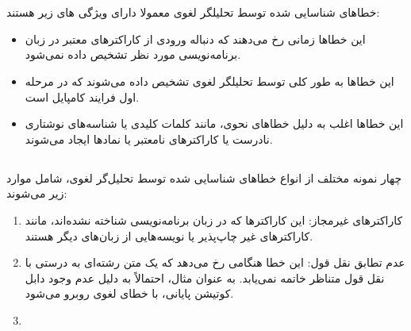 \documentclass{article}
\begin{document}


\section{}
\subsection{}
خطاهای شناسایی شده توسط تحلیلگر لغوی معمولا دارای ویژگی های زیر هستند:
\begin{itemize}
\item این خطاها زمانی رخ می‌دهند که دنباله ورودی از کاراکترهای معتبر در زبان برنامه‌نویسی مورد نظر تشخیص داده نمی‌شود.
\item این خطاها به طور کلی توسط تحلیلگر لغوی تشخیص داده می‌شوند که در مرحله اول فرایند کامپایل است.
\item این خطاها اغلب به دلیل خطاهای نحوی، مانند کلمات کلیدی یا شناسه‌های نوشتاری نادرست یا کاراکترهای نامعتبر یا نمادها ایجاد می‌شوند.
\end{itemize}

\subsection{}
چهار نمونه مختلف از انواع خطاهای شناسایی شده توسط تحلیل‌گر لغوی، شامل موارد زیر می‌شوند:

\begin{enumerate}
\item کاراکترهای غیرمجاز: این کاراکترها که در زبان برنامه‌نویسی شناخته نشده‌اند، مانند کاراکترهای غیر چاپ‌پذیر یا نویسه‌هایی از زبان‌های دیگر هستند.
\item عدم تطابق نقل قول: این خطا هنگامی رخ می‌دهد که یک متن رشته‌ای به درستی با نقل قول متناظر خاتمه نمی‌یابد. به عنوان مثال،  احتمالاً به دلیل عدم وجود دابل کوتیشن پایانی، با خطای لغوی روبرو می‌شود.
\item
\end{enumerate}













%


\end{document}
